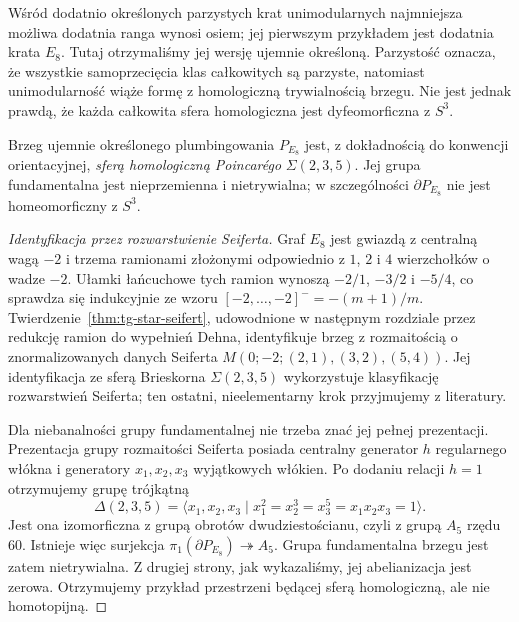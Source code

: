 \begin{uwaga}
Wśród dodatnio określonych parzystych krat unimodularnych
najmniejsza możliwa dodatnia ranga wynosi osiem; jej
pierwszym przykładem jest dodatnia krata $E_8$.
Tutaj otrzymaliśmy jej wersję ujemnie określoną.
Parzystość oznacza, że wszystkie samoprzecięcia klas
całkowitych są parzyste, natomiast unimodularność
wiąże formę z homologiczną trywialnością brzegu.
Nie jest jednak prawdą, że każda całkowita sfera
homologiczna jest dyfeomorficzna z $S^3$.
\end{uwaga}

\begin{stwierdzenie}
Brzeg ujemnie określonego plumbingowania $P_{E_8}$
jest, z dokładnością do konwencji orientacyjnej,
\emph{sferą homologiczną Poincarégo}
$\Sigma(2,3,5)$. Jej grupa fundamentalna jest
nieprzemienna i nietrywialna; w szczególności
$\partial P_{E_8}$ nie jest homeomorficzny z $S^3$.
\end{stwierdzenie}

\begin{proof}[Identyfikacja przez rozwarstwienie Seiferta]
Graf $E_8$ jest gwiazdą z centralną wagą $-2$ i trzema
ramionami złożonymi odpowiednio z $1$, $2$ i $4$
wierzchołków o wadze $-2$. Ułamki łańcuchowe tych ramion
wynoszą $-2/1$, $-3/2$ i $-5/4$, co sprawdza się
indukcyjnie ze wzoru $[-2,\ldots,-2]^-=-(m+1)/m$.
Twierdzenie~\ref{thm:tg-star-seifert}, udowodnione w
następnym rozdziale przez redukcję ramion do wypełnień Dehna,
identyfikuje brzeg z rozmaitością o znormalizowanych danych
Seiferta $M(0;-2;(2,1),(3,2),(5,4))$.
Jej identyfikacja ze sferą Brieskorna $\Sigma(2,3,5)$
wykorzystuje klasyfikację rozwarstwień Seiferta; ten ostatni,
nieelementarny krok przyjmujemy z literatury.

Dla niebanalności grupy fundamentalnej nie trzeba
znać jej pełnej prezentacji. Prezentacja grupy rozmaitości
Seiferta posiada centralny generator $h$ regularnego
włókna i generatory $x_1,x_2,x_3$ wyjątkowych włókien.
Po dodaniu relacji $h=1$ otrzymujemy grupę trójkątną
\[
\Delta(2,3,5)=\langle x_1,x_2,x_3\mid
x_1^2=x_2^3=x_3^5=x_1x_2x_3=1\rangle.
\]
Jest ona izomorficzna z grupą obrotów dwudziestościanu,
czyli z grupą $A_5$ rzędu $60$. Istnieje więc
surjekcja $\pi_1(\partial P_{E_8})\twoheadrightarrow A_5$.
Grupa fundamentalna brzegu jest zatem nietrywialna.
Z drugiej strony, jak wykazaliśmy, jej abelianizacja
jest zerowa. Otrzymujemy przykład przestrzeni będącej
sferą homologiczną, ale nie homotopijną.
\end{proof}

